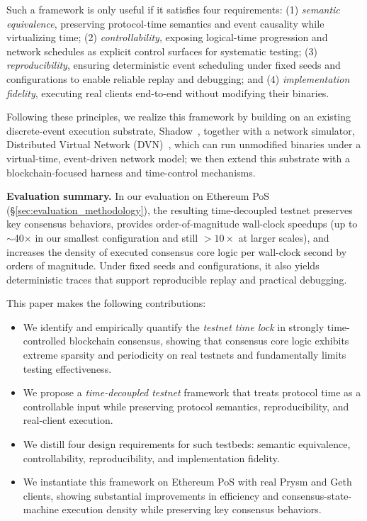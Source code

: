 Such a framework is only useful if it satisfies four requirements:
(1) \emph{semantic equivalence}, preserving protocol-time semantics and event causality while virtualizing time;
(2) \emph{controllability}, exposing logical-time progression and network schedules as explicit control surfaces for systematic testing;
(3) \emph{reproducibility}, ensuring deterministic event scheduling under fixed seeds and configurations to enable reliable replay and debugging; and
(4) \emph{implementation fidelity}, executing real clients end-to-end without modifying their binaries.


Following these principles, we realize this framework by building on an existing discrete-event execution substrate, Shadow~\cite{jansen2011shadow}, together with a network simulator, Distributed Virtual Network (DVN)~\cite{foo2010dvn}, which can run unmodified binaries under a virtual-time, event-driven network model; we then extend this substrate with a blockchain-focused harness and time-control mechanisms.

\smallskip
\noindent\textbf{Evaluation summary.}
In our evaluation on Ethereum PoS (\S\ref{sec:evaluation_methodology}), the resulting time-decoupled testnet preserves key consensus behaviors, provides order-of-magnitude wall-clock speedups (up to $\sim$40$\times$ in our smallest configuration and still $>10\times$ at larger scales), and increases the density of executed consensus core logic per wall-clock second by orders of magnitude. Under fixed seeds and configurations, it also yields deterministic traces that support reproducible replay and practical debugging.


This paper makes the following contributions:
\begin{itemize}
\item We identify and empirically quantify the \emph{testnet time lock} in strongly time-controlled blockchain consensus, showing that consensus core logic exhibits extreme sparsity and periodicity on real testnets and fundamentally limits testing effectiveness.
\item We propose a \emph{time-decoupled testnet} framework that treats protocol time as a controllable input while preserving protocol semantics, reproducibility, and real-client execution.
\item We distill four design requirements for such testbeds: semantic equivalence, controllability, reproducibility, and implementation fidelity.
\item We instantiate this framework on Ethereum PoS with real Prysm and Geth clients, showing substantial improvements in efficiency and consensus-state-machine execution density while preserving key consensus behaviors.
\end{itemize}

